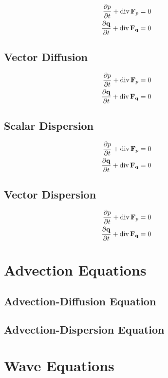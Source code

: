 \begin{align}
	\pdv{p}{t} + \operatorname{div}{\vb{F}_{p}} &= 0 \\
	\pdv{\vb{q}}{t} + \operatorname{div}{\vb{F}_{\vb{q}}} &= 0
\end{align}

\subsection{Vector Diffusion}

\begin{align}
	\pdv{p}{t} + \operatorname{div}{\vb{F}_{p}} &= 0 \\
	\pdv{\vb{q}}{t} + \operatorname{div}{\vb{F}_{\vb{q}}} &= 0
\end{align}

\subsection{Scalar Dispersion}

\begin{align}
	\pdv{p}{t} + \operatorname{div}{\vb{F}_{p}} &= 0 \\
	\pdv{\vb{q}}{t} + \operatorname{div}{\vb{F}_{\vb{q}}} &= 0
\end{align}

\subsection{Vector Dispersion}

\begin{align}
	\pdv{p}{t} + \operatorname{div}{\vb{F}_{p}} &= 0 \\
	\pdv{\vb{q}}{t} + \operatorname{div}{\vb{F}_{\vb{q}}} &= 0
\end{align}

\section{Advection Equations}

\subsection{Advection-Diffusion Equation}

\subsection{Advection-Dispersion Equation}

\section{Wave Equations}

